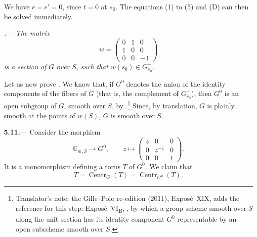 We have \(e=e'=0\), since \(t=0\) at \(s_0\).  The equations
\textup{(1)} to \textup{(5)} and \textup{(D)} can then be solved immediately.

\par\medskip\noindent
{}\textbf{\textit{.}}---
\textit{The matrix}
\[
  w=
  \begin{pmatrix}
    0&1&0\\
    1&0&0\\
    0&0&-1
  \end{pmatrix}
\]
\textit{is a section of \(G\) over \(S\), such that
\(w(s_0)\in G^-_{s_0}\).}

Let us now prove .  We know that, if \(G^0\) denotes the union of the identity
components of the fibers of \(G\) (that is, the complement of
\(G^-_{s_0}\)), then \(G^0\) is an open subgroup of \(G\), smooth over
\(S\), by .\footnote{Translator's note: the Gille--Polo re-edition (2011), Exposé~XIX, adds the reference for
this step: Exposé~VI\textsubscript{B}, , by which a group scheme smooth over
\(S\) along the unit section has its identity component \(G^0\) representable
by an open subscheme smooth over \(S\).}  Since, by translation, \(G\) is plainly smooth at the
points of \(w(S)\), \(G\) is smooth over \(S\).

\par\medskip\noindent
\textbf{5.11.}---
Consider the morphism
\[
  \mathbb G_{m,S}\longrightarrow G^0,
  \qquad
  z\longmapsto
  \begin{pmatrix}
    z&0&0\\
    0&z^{-1}&0\\
    0&0&1
  \end{pmatrix}.
\]
It is a monomorphism defining a torus \(T\) of \(G^0\).  We claim
that
\[
  T=\operatorname{Centr}_G(T)
   =\operatorname{Centr}_{G^0}(T).
\]
